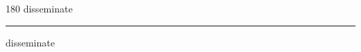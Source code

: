 
\begin{frame}
\begin{center}
\begin{turn}{180}
{\fontsize{2.5cm}{1em}\selectfont disseminate}
\end{turn}
\vspace{1em}\par  
\hrule
\vspace{1em}\par  
{\fontsize{2.5cm}{1em}\selectfont disseminate}
\end{center}
\end{frame}
